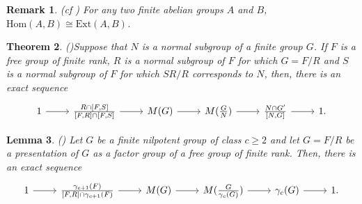 \documentclass[preprint,sort&compress,12pt]{elsarticle}
\newtheorem{theorem}{Theorem}[section]
\newtheorem{lemma}[theorem]{Lemma}
\newtheorem{remark}[theorem]{Remark}
\numberwithin{equation}{section}
\theoremstyle{definition}
\newtheorem{definition}[theorem]{Definition}
\begin{document}
\begin{remark} (cf \cite[pg 27]{Karp1987}) \label{Hom and Ext isomorphism for finite abelian groups}
    For any two finite abelian groups $A$ and $B$, $\mathrm{Hom}(A,B) \cong \mathrm{Ext}(A,B)$. 
\end{remark}





\begin{theorem}(\cite[Theorem 3.2.1]{Karp1987})\label{Blackburn general  exact sequence}
    Suppose that $N$ is a normal subgroup of a finite group $G$. If $F$ is a free group of finite rank, $R$ is a normal subgroup of $F$ for which $G=F/R$ and $S$ is a normal subgroup of $F$ for which $SR/R$ corresponds to $N$, then, there is an exact sequence
    \begin{equation}
\begin{tikzcd}
 1 \arrow[r] & \frac{R \cap [F,S]}{[F,R] \cap [F,S]} \arrow[r] & M(G) \arrow[r] & M(\frac{G}{N}) \arrow[r] & \frac{N \cap G'}{[N,G]} \arrow[r] & 1.
\end{tikzcd}
\label{eq:Blackburn general exact sequence}
\end{equation}
\end{theorem}


\begin{lemma}(\cite[Corollary 3.2.3]{Karp1987}) \label{Karpilovsky exact sequence}
    Let $G$ be a finite nilpotent group of class $c \geq 2$ and let $G=F/R$ be a presentation of $G$ as a factor group of a free group of finite rank. Then, there is an exact sequence
    \begin{equation}
\begin{tikzcd}
 1 \arrow[r] & \frac{\gamma_{c+1}(F)}{[F,R] \cap \gamma_{c+1}(F)} \arrow[r] & M(G) \arrow[r] & M(\frac{G}{\gamma_c(G)}) \arrow[r] & \gamma_c(G) \arrow[r] & 1.
\end{tikzcd}
\label{Blackburn exact sequence}
\end{equation}
\end{lemma}
\end{document}
